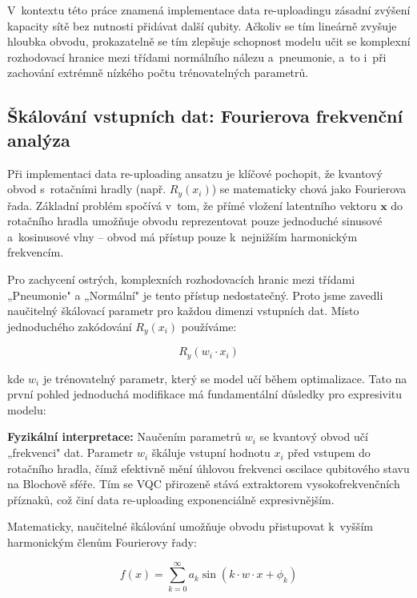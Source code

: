 \documentclass[12pt, a4paper]{report}
\begin{document}
V~kontextu této práce znamená implementace data re-uploadingu zásadní zvýšení kapacity sítě bez nutnosti přidávat další qubity. Ačkoliv se tím lineárně zvyšuje hloubka obvodu, prokazatelně se tím zlepšuje schopnost modelu učit se komplexní rozhodovací hranice mezi třídami normálního nálezu a~pneumonie, a~to i~při zachování extrémně nízkého počtu trénovatelných parametrů.

\subsection{Škálování vstupních dat: Fourierova frekvenční analýza}
\label{sec:fourier_scaling}

Při implementaci data re-uploading ansatzu je klíčové pochopit, že kvantový obvod s~rotačními hradly (např. $R_y(x_i)$) se matematicky chová jako Fourierova řada. Základní problém spočívá v~tom, že přímé vložení latentního vektoru $\mathbf{x}$ do rotačního hradla umožňuje obvodu reprezentovat pouze jednoduché sinusové a~kosinusové vlny – obvod má přístup pouze k~nejnižším harmonickým frekvencím.

Pro zachycení ostrých, komplexních rozhodovacích hranic mezi třídami „Pneumonie" a „Normální" je tento přístup nedostatečný. Proto jsme zavedli naučitelný škálovací parametr pro každou dimenzi vstupních dat. Místo jednoduchého zakódování $R_y(x_i)$ používáme:

\begin{equation}
    R_y(w_i \cdot x_i)
\end{equation}

kde $w_i$ je trénovatelný parametr, který se model učí během optimalizace. Tato na první pohled jednoduchá modifikace má fundamentální důsledky pro expresivitu modelu:

\textbf{Fyzikální interpretace:} Naučením parametrů $w_i$ se kvantový obvod učí „frekvenci" dat. Parametr $w_i$ škáluje vstupní hodnotu $x_i$ před vstupem do rotačního hradla, čímž efektivně mění úhlovou frekvenci oscilace qubitového stavu na Blochově sféře. Tím se VQC přirozeně stává extraktorem vysokofrekvenčních příznaků, což činí data re-uploading exponenciálně expresivnějším.

Matematicky, naučitelné škálování umožňuje obvodu přistupovat k~vyšším harmonickým členům Fourierovy řady:

\begin{equation}
    f(x) = \sum_{k=0}^{\infty} a_k \sin(k \cdot w \cdot x + \phi_k)
\end{equation}
\end{document}
